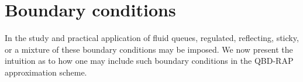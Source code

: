 %


\section{Boundary conditions}\label{sec: boundary conditions}
In the study and practical application of fluid queues, regulated, reflecting, sticky, or a mixture of these boundary conditions may be imposed. We now present the intuition as to how one may include such boundary conditions in the QBD-RAP approximation scheme. 

